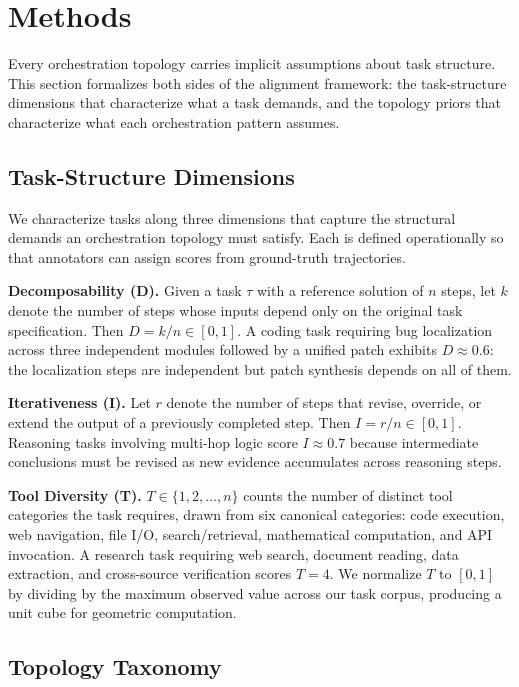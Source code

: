 \section{Methods}

Every orchestration topology carries implicit assumptions about task structure. This section formalizes both sides of the alignment framework: the task-structure dimensions that characterize what a task demands, and the topology priors that characterize what each orchestration pattern assumes.

\subsection{Task-Structure Dimensions}\label{task-structure-dimensions}

We characterize tasks along three dimensions that capture the structural demands an orchestration topology must satisfy. Each is defined operationally so that annotators can assign scores from ground-truth trajectories.

\textbf{Decomposability (D).} Given a task $\tau$ with a reference solution of $n$ steps, let $k$ denote the number of steps whose inputs depend only on the original task specification. Then $D = k / n \in [0, 1]$. A coding task requiring bug localization across three independent modules followed by a unified patch exhibits $D \approx 0.6$: the localization steps are independent but patch synthesis depends on all of them.

\textbf{Iterativeness (I).} Let $r$ denote the number of steps that revise, override, or extend the output of a previously completed step. Then $I = r / n \in [0, 1]$. Reasoning tasks involving multi-hop logic score $I \approx 0.7$ because intermediate conclusions must be revised as new evidence accumulates across reasoning steps.

\textbf{Tool Diversity (T).} $T \in \{1, 2, \ldots, n\}$ counts the number of distinct tool categories the task requires, drawn from six canonical categories: code execution, web navigation, file I/O, search/retrieval, mathematical computation, and API invocation. A research task requiring web search, document reading, data extraction, and cross-source verification scores $T = 4$. We normalize $T$ to $[0, 1]$ by dividing by the maximum observed value across our task corpus, producing a unit cube for geometric computation.

\subsection{Topology Taxonomy}\label{topology-taxonomy}

